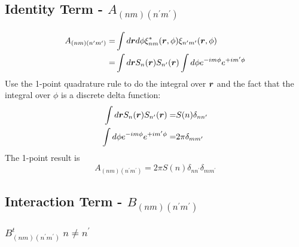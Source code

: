 \documentclass [10pt,letterpaper]{article}
\renewcommand{\vec}{\vectorsym}
\begin{document}
\subsection{Identity Term - $A_{(n m)(n^\prime m^\prime)}$ }
\label{sub:identity-term-Anmnpmp}
\begin{equation} \label{eq:der-calculate-Anmnpmp}
	\begin{split}
		A_{(n m)(n^\prime m^\prime)}
		=&
		\int d\vec{r} d\phi
		\xi^*_{n m}
		(\vec{r},\phi)
		\xi_{n^\prime m^\prime}
		(\vec{r},\phi) 
		\\
		=&
		\int d\vec{r}
		S_n(\vec{r})
		S_{n^\prime}(\vec{r})
		\int d\phi
		e^{-i m \phi}
		e^{+i m^\prime \phi} 
	\end{split}
\end{equation}
Use the 1-point quadrature rule to do the integral over $\vec{r}$ and the fact that the integral over $\phi$ is a discrete delta function:
\begin{align*}
	\int d\vec{r}
	S_n(\vec{r})
	S_{n^\prime}(\vec{r})
	=&
	S(n)
	\delta_{n n^\prime}
	\\
	\int d\phi
	e^{-i m \phi}
	e^{+i m^\prime \phi}
	=&
	2\pi
	\delta_{m m^\prime}
\end{align*}
The 1-point result is
\begin{equation} \label{eq:result-Anmnpmp-1pt}
	A_{(n m)(n^\prime m^\prime)}
	=
	2\pi S(n)
	\delta_{n n^\prime}
	\delta_{m m^\prime}
\end{equation}
\subsection{Interaction Term - $B_{(n m)(n^\prime m^\prime)}$}
\label{sub:interaction-term-Bnmnpmp}
\subsubsection{$B^t_{(n m)(n^\prime m^\prime)} \ n\neq n^\prime$}
\label{subsub:Btnmnpmp-off-diagonal}
\end{document}
